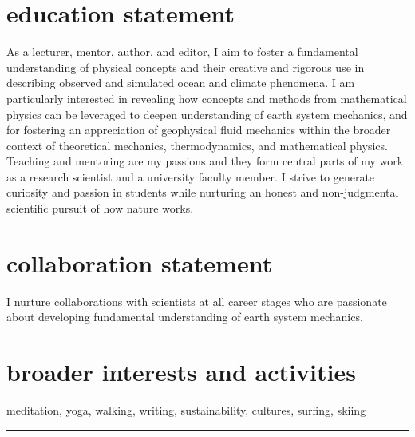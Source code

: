 \documentclass{article}
\begin{document}
\vspace{-.5cm}
\section*{\sc \color{Maroon} education statement}
\vspace{-.3cm}
As a lecturer, mentor, author, and editor, I aim to foster a fundamental understanding of physical concepts and their creative and rigorous use in describing observed and simulated ocean and climate phenomena. I am particularly interested in revealing how concepts and methods from mathematical physics can be leveraged to deepen understanding of earth system mechanics, and for fostering an appreciation of geophysical fluid mechanics within the broader context of theoretical mechanics, thermodynamics, and mathematical physics.  
Teaching and mentoring are my passions and they form central parts of my work as a research scientist and a university faculty member. I strive to generate curiosity and passion in students while nurturing an honest and non-judgmental scientific pursuit of how nature works. 

\vspace{-.5cm}
\section*{\sc  \color{Maroon}  collaboration statement}
\vspace{-.3cm}
I nurture collaborations with scientists at all career stages who are passionate about developing fundamental understanding of earth system mechanics. 

\vspace{-.5cm}
\section*{\sc  \color{Maroon}  broader interests and activities}
\vspace{-.3cm}
meditation, yoga, walking, writing, sustainability, cultures, surfing, skiing

\noindent\rule{\textwidth}{1pt}


\vspace{-.2cm}
\end{document}

